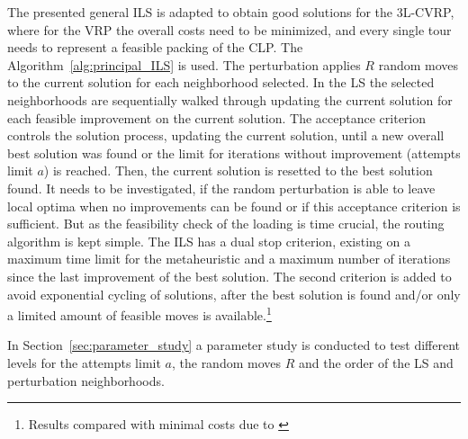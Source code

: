 The presented general \gls{ILS} is adapted to obtain good solutions for the \gls{3L-CVRP}, where for the \gls{VRP}
the overall costs need to be minimized, and every single tour needs to represent a feasible packing of the \gls{CLP}.
The Algorithm~\ref{alg:principal_ILS} is used. The perturbation applies $R$ random moves
to the current solution for each neighborhood selected. In the \gls{LS}
the selected neighborhoods are sequentially walked through updating the current solution for each feasible improvement on
the current solution. The acceptance criterion controls the solution process, updating the current solution, until a new overall
best solution was found or the limit for iterations without improvement (attempts limit $a$) is reached. Then, the current solution is resetted
to the best solution found. It needs to be investigated, if the random perturbation is able to leave local optima
when no improvements can be found or if this acceptance criterion is sufficient. But as the feasibility check of the loading
is time crucial, the routing algorithm is kept simple. The \gls{ILS} has a dual stop criterion, existing on a maximum time limit for the metaheuristic and a maximum number of
iterations since the last improvement of the best solution. The second criterion is added
to avoid exponential cycling of solutions, after the best solution is found and/or only a limited amount of feasible moves is available.\footnote{Results compared with
    minimal costs due to \cite{tamke_branch-and-cut_2024}}



In Section~\ref{sec:parameter_study} a parameter study is conducted to test different
levels for the attempts limit $a$, the random moves $R$ and the order of the \gls{LS} and perturbation neighborhoods.

